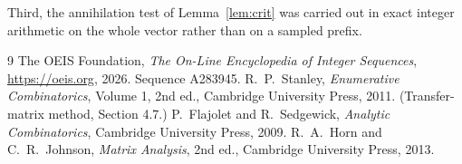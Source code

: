 \documentclass[11pt,a4paper]{article}
\theoremstyle{plain}
\theoremstyle{definition}
\begin{document}
Third, the annihilation test of Lemma~\ref{lem:crit} was carried out in exact integer
arithmetic on the whole vector rather than on a sampled prefix.

\begin{thebibliography}{9}
 The OEIS Foundation, \emph{The On-Line Encyclopedia of Integer
Sequences}, \url{https://oeis.org}, 2026. Sequence A283945.
 R.~P.~Stanley, \emph{Enumerative Combinatorics}, Volume 1, 2nd ed.,
Cambridge University Press, 2011. (Transfer-matrix method, Section 4.7.)
 P.~Flajolet and R.~Sedgewick, \emph{Analytic Combinatorics}, Cambridge
University Press, 2009.
 R.~A.~Horn and C.~R.~Johnson, \emph{Matrix Analysis}, 2nd ed., Cambridge
University Press, 2013.
\end{thebibliography}
\end{document}
